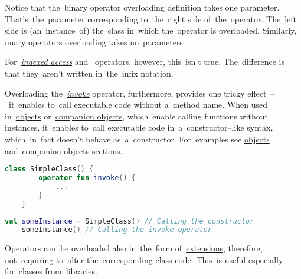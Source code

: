 \noindent Notice that the~binary operator overloading definition takes one parameter.
That's~the~parameter corresponding to~the~right side of~the~operator.
The~left side is (an~instance~of) the~class in~which the~operator is overloaded.
Similarly, unary operators overloading takes no~parameters.

For~\hyperref[kotlinindexedaccess]{\textit{indexed access}} and~ operators, however, this~isn't true.
The~difference is that they~aren't written in~the~infix notation.

\label{kotlininvokeoverload}
Overloading the~\hyperref[kotlininvoke]{\textit{invoke}} operator, furthermore, provides one tricky effect~--~it~enables to~call executable code without a~method name.
When used in~\hyperref[kotlinobject]{objects} or~\hyperref[kotlincompanionobject]{companion objects}, which~enable calling functions without instances, it~enables to~call executable code in~a~constructor--like syntax, which~in~fact doesn't behave as~a~constructor.
For~examples see \hyperref[kotlinobject]{objects} and~\hyperref[kotlincompanionobject]{companion objects} sections.
\newpage

\begin{lstlisting}[language=Kotlin, title={Custom class with \textit{invoke} operator overloading}]
    class SimpleClass() {
        operator fun invoke() {
            ...
        }
    }
\end{lstlisting}
\begin{lstlisting}[language=Kotlin, title={Usage -- no conflict with constructor}]
    val someInstance = SimpleClass() // Calling the constructor
    someInstance() // Calling the invoke operator
\end{lstlisting}

\note Operators can~be overloaded also in~the~form of~\hyperref[kotlinextension]{extensions}, therefore, not~requiring to~alter the~corresponding class code.
This~is useful especially for~classes from~libraries.

